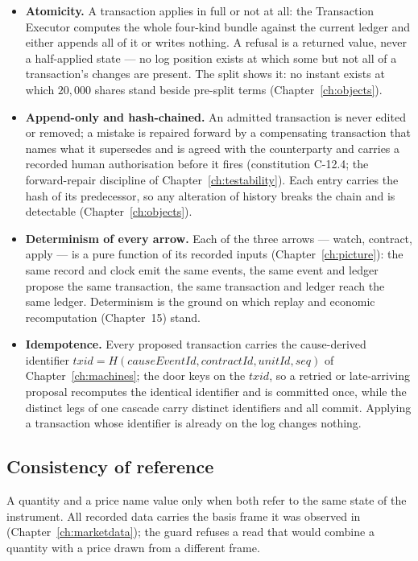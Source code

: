 \begin{itemize}[leftmargin=1.4em,itemsep=2pt]
\item \textbf{Atomicity.} A transaction applies in full or not at all: the
  Transaction Executor computes the whole four-kind bundle against the current
  ledger and either appends all of it or writes nothing. A refusal is a returned
  value, never a half-applied state --- no log position exists at which some but
  not all of a transaction's changes are present. The split shows it: no instant
  exists at which $20{,}000$ shares stand beside pre-split terms
  (Chapter~\ref{ch:objects}).
\item \textbf{Append-only and hash-chained.} An admitted transaction is never
  edited or removed; a mistake is repaired forward by a compensating transaction that
  names what it supersedes and is agreed with the counterparty and carries a recorded human
  authorisation before it fires
  (constitution C-12.4; the forward-repair discipline of Chapter~\ref{ch:testability}).
  Each entry carries the hash of its predecessor, so
  any alteration of history breaks the chain and is detectable
  (Chapter~\ref{ch:objects}).
\item \textbf{Determinism of every arrow.} Each of the three arrows --- watch,
  contract, apply --- is a pure function of its recorded inputs
  (Chapter~\ref{ch:picture}): the same record and clock emit the same events, the
  same event and ledger propose the same transaction, the same transaction and
  ledger reach the same ledger. Determinism is the ground on which replay and
  economic recomputation (Chapter~15) stand.
\item \textbf{Idempotence.} Every proposed transaction carries the cause-derived
  identifier $\mathit{txid}=H(\mathit{causeEventId},\mathit{contractId},\mathit{unitId},\mathit{seq})$
  of Chapter~\ref{ch:machines}; the door keys on the $\mathit{txid}$, so a retried or
  late-arriving proposal recomputes the identical identifier and is committed once,
  while the distinct legs of one cascade carry distinct identifiers and all commit.
  Applying a transaction whose identifier is already on the log changes nothing.
\end{itemize}

\subsection{Consistency of reference}

A quantity and a price name value only when both refer to the same state of the
instrument. All recorded data carries the basis frame it was observed in
(Chapter~\ref{ch:marketdata}); the guard refuses a read that would combine a
quantity with a price drawn from a different frame.

